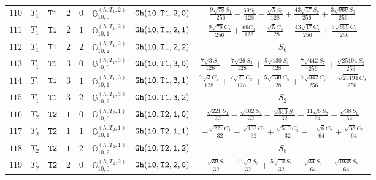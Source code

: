 \documentclass[fleqn,8pt]{jsarticle}
\begin{document}
\begin{table}[ht!]
\begin{center}
\begin{tabular}{cccccccc}
$ 110 $ & $ T_{1} $ & $ {\tt T1} $ & $ 2 $ & $ 0 $ & $ \mathbb{G}_{10,0}^{(h,T_{1},2)} $ & $ {\tt Gh(10,T1,2,0)} $ & $ \frac{9 \sqrt{78} S_{1}}{256} - \frac{69 S_{3}}{128} - \frac{\sqrt{5} S_{5}}{128} + \frac{43 \sqrt{17} S_{7}}{256} + \frac{3 \sqrt{969} S_{9}}{256} $ \\
$ 111 $ & $ T_{1} $ & $ {\tt T1} $ & $ 2 $ & $ 1 $ & $ \mathbb{G}_{10,1}^{(h,T_{1},2)} $ & $ {\tt Gh(10,T1,2,1)} $ & $ \frac{9 \sqrt{78} C_{1}}{256} + \frac{69 C_{3}}{128} - \frac{\sqrt{5} C_{5}}{128} - \frac{43 \sqrt{17} C_{7}}{256} + \frac{3 \sqrt{969} C_{9}}{256} $ \\
$ 112 $ & $ T_{1} $ & $ {\tt T1} $ & $ 2 $ & $ 2 $ & $ \mathbb{G}_{10,2}^{(h,T_{1},2)} $ & $ {\tt Gh(10,T1,2,2)} $ & $ S_{6} $ \\
$ 113 $ & $ T_{1} $ & $ {\tt T1} $ & $ 3 $ & $ 0 $ & $ \mathbb{G}_{10,0}^{(h,T_{1},3)} $ & $ {\tt Gh(10,T1,3,0)} $ & $ \frac{7 \sqrt{3} S_{1}}{128} - \frac{7 \sqrt{26} S_{3}}{128} + \frac{5 \sqrt{130} S_{5}}{128} - \frac{7 \sqrt{442} S_{7}}{256} + \frac{\sqrt{25194} S_{9}}{256} $ \\
$ 114 $ & $ T_{1} $ & $ {\tt T1} $ & $ 3 $ & $ 1 $ & $ \mathbb{G}_{10,1}^{(h,T_{1},3)} $ & $ {\tt Gh(10,T1,3,1)} $ & $ \frac{7 \sqrt{3} C_{1}}{128} + \frac{7 \sqrt{26} C_{3}}{128} + \frac{5 \sqrt{130} C_{5}}{128} + \frac{7 \sqrt{442} C_{7}}{256} + \frac{\sqrt{25194} C_{9}}{256} $ \\
$ 115 $ & $ T_{1} $ & $ {\tt T1} $ & $ 3 $ & $ 2 $ & $ \mathbb{G}_{10,2}^{(h,T_{1},3)} $ & $ {\tt Gh(10,T1,3,2)} $ & $ S_{2} $ \\
$ 116 $ & $ T_{2} $ & $ {\tt T2} $ & $ 1 $ & $ 0 $ & $ \mathbb{G}_{10,0}^{(h,T_{2},1)} $ & $ {\tt Gh(10,T2,1,0)} $ & $ \frac{\sqrt{221} S_{1}}{32} - \frac{\sqrt{102} S_{3}}{32} - \frac{\sqrt{510} S_{5}}{32} - \frac{11 \sqrt{6} S_{7}}{64} - \frac{\sqrt{38} S_{9}}{64} $ \\
$ 117 $ & $ T_{2} $ & $ {\tt T2} $ & $ 1 $ & $ 1 $ & $ \mathbb{G}_{10,1}^{(h,T_{2},1)} $ & $ {\tt Gh(10,T2,1,1)} $ & $ - \frac{\sqrt{221} C_{1}}{32} - \frac{\sqrt{102} C_{3}}{32} + \frac{\sqrt{510} C_{5}}{32} - \frac{11 \sqrt{6} C_{7}}{64} + \frac{\sqrt{38} C_{9}}{64} $ \\
$ 118 $ & $ T_{2} $ & $ {\tt T2} $ & $ 1 $ & $ 2 $ & $ \mathbb{G}_{10,2}^{(h,T_{2},1)} $ & $ {\tt Gh(10,T2,1,2)} $ & $ S_{8} $ \\
$ 119 $ & $ T_{2} $ & $ {\tt T2} $ & $ 2 $ & $ 0 $ & $ \mathbb{G}_{10,0}^{(h,T_{2},2)} $ & $ {\tt Gh(10,T2,2,0)} $ & $ \frac{\sqrt{39} S_{1}}{32} - \frac{11 \sqrt{2} S_{3}}{32} + \frac{5 \sqrt{10} S_{5}}{32} - \frac{\sqrt{34} S_{7}}{64} - \frac{\sqrt{1938} S_{9}}{64} $ \\

\end{tabular}
\end{center}
\end{table}
\end{document}

